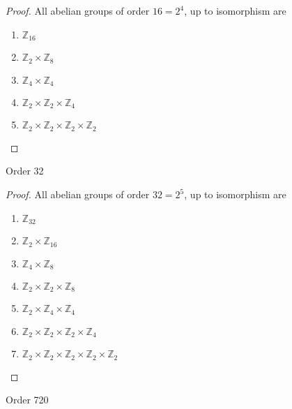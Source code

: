 \begin{proof}
    All abelian groups of order $16 = 2^{4}$, up to isomorphism are
    \begin{enumerate}
        \item $\mathbb{Z}_{16}$
        \item $\mathbb{Z}_{2} \times \mathbb{Z}_{8}$
        \item $\mathbb{Z}_{4} \times \mathbb{Z}_{4}$
        \item $\mathbb{Z}_{2} \times \mathbb{Z}_{2} \times \mathbb{Z}_{4}$
        \item $\mathbb{Z}_{2} \times \mathbb{Z}_{2} \times \mathbb{Z}_{2} \times \mathbb{Z}_{2}$
    \end{enumerate}
\end{proof}

\newpage
\begin{exercise}
    Order 32
\end{exercise}

\begin{proof}
    All abelian groups of order $32 = 2^{5}$, up to isomorphism are
    \begin{enumerate}
        \item $\mathbb{Z}_{32}$
        \item $\mathbb{Z}_{2} \times \mathbb{Z}_{16}$
        \item $\mathbb{Z}_{4} \times \mathbb{Z}_{8}$
        \item $\mathbb{Z}_{2} \times \mathbb{Z}_{2} \times \mathbb{Z}_{8}$
        \item $\mathbb{Z}_{2} \times \mathbb{Z}_{4} \times \mathbb{Z}_{4}$
        \item $\mathbb{Z}_{2} \times \mathbb{Z}_{2} \times \mathbb{Z}_{2} \times \mathbb{Z}_{4}$
        \item $\mathbb{Z}_{2} \times \mathbb{Z}_{2} \times \mathbb{Z}_{2} \times \mathbb{Z}_{2} \times \mathbb{Z}_{2}$
    \end{enumerate}
\end{proof}

\newpage
\begin{exercise}
    Order 720
\end{exercise}

